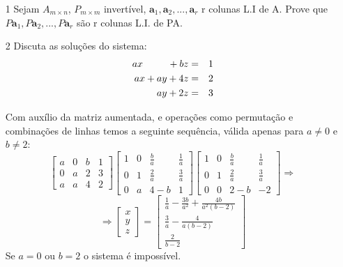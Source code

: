 \documentclass[a4paper]{article}
\begin{document}
\begin{itemize}
\item[1] Sejam $A_{m \times n}$, $P_{m \times m}$ invertível, $\textbf{a}_1, \textbf{a}_2, ..., \textbf{a}_r$ r colunas L.I de A. Prove que $P\textbf{a}_1,P\textbf{a}_2,...,P\textbf{a}_r$ são r colunas L.I. de PA.

\item[2] Discuta as soluções do sistema:
\begin{eqnarray*} 
ax \hspace{9mm} +bz &=&1\\
ax+ay+4z&=&2\\
ay+2z&=&3 
\end{eqnarray*}

\textcolor[rgb]{0,0,1}{Com auxílio da matriz aumentada, e operações como permutação e combinações de linhas temos a seguinte sequência, válida apenas para $a\neq0$ e $b\neq2$:
$$
\begin{bmatrix}
a&0&b&1\\0&a&2&3\\a&a&4&2
\end{bmatrix}
\begin{bmatrix}
1&0&\frac{b}{a}&\frac{1}{a}\\0&1&\frac{2}{a}&\frac{3}{a}\\0&a&4-b&1
\end{bmatrix}
\begin{bmatrix}
1&0&\frac{b}{a}&\frac{1}{a}\\0&1&\frac{2}{a}&\frac{3}{a}\\0&0&2-b&-2
\end{bmatrix}
\Rightarrow
$$
$$
\Rightarrow
\begin{bmatrix}
x\\y\\z
\end{bmatrix}
=
\begin{bmatrix}
\frac{1}{a}-\frac{3b}{a^2} + \frac{4b}{a^2(b-2)}\\\frac{3}{a}-\frac{4}{a(b-2)}\\\frac{2}{b-2}
\end{bmatrix}
$$
Se $a=0$ ou $b=2$ o sistema é impossível.}


\end{itemize}
\end{document}
